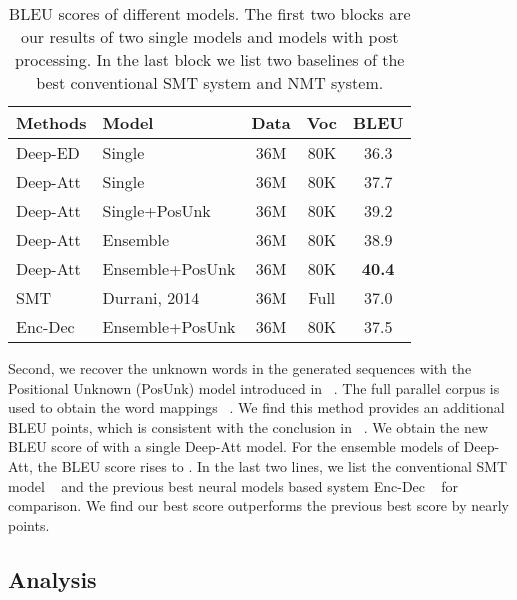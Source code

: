 \documentclass[11pt,letterpaper]{article}
\begin{document}
\begin{table}[!ht]
\footnotesize
\begin{center}
\begin{tabular}{|l|l|c|c|c|}
\hline
  Methods & Model & Data & Voc & BLEU \\
  \hline
  \hline
  Deep-ED & Single  & 36M & 80K & 36.3 \\
  Deep-Att & Single & 36M & 80K & 37.7 \\
  \hline
  Deep-Att & Single+PosUnk  & 36M & 80K & 39.2 \\
  Deep-Att & Ensemble  & 36M & 80K & 38.9 \\
  Deep-Att & Ensemble+PosUnk  & 36M & 80K & \textbf{40.4} \\
  \hline
  SMT   & Durrani, 2014  & 36M & Full & 37.0 \\
  Enc-Dec & Ensemble+PosUnk & 36M & 80K & 37.5 \\
  \hline
\end{tabular}
\end{center}
\caption{\label{tab:Results-BLEU-Post} BLEU scores of different models. The first two blocks are our results of  two single models and models
with post processing. In the last block we list two baselines of the best conventional SMT system and NMT system.}
\end{table}


Second,  we recover the unknown words in the generated sequences with the Positional Unknown (\mbox{PosUnk}) model introduced in
~\cite{Luong-Zaremba-ACL2015}. The full parallel corpus is used to obtain the word mappings ~\cite{Liang-Klein-NAACL06}. We find this method
provides an additional   BLEU points, which is consistent  with the conclusion in ~.  We obtain the new
BLEU score of  with a single Deep-Att model.  For the ensemble models of Deep-Att, the BLEU score rises to . In the last two
lines, we list the conventional SMT model ~\cite{Durrani-Heafield-WMT2014} and the previous best neural models based system Enc-Dec
~\cite{Luong-Zaremba-ACL2015} for comparison. We find our best score outperforms the previous best score by nearly  points.

\subsection{Analysis}
\end{document}
